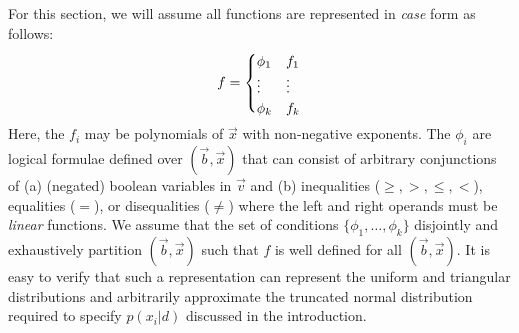 \documentclass[letterpaper]{article}
\renewcommand{\-}{\text{-}}
\begin{document}
{For this section, we will assume all functions
are represented in \emph{case} form as follows:
\vspace{-1mm}
{%
\begin{align}
f = 
\begin{cases}
  \phi_1 & f_1 \\ 
  \vdots & \vdots \\ 
  \phi_k & f_k \\ 
  \vspace{-6mm}
\end{cases} \label{eq:case}
\end{align}
} 
Here, the $f_i$ may be polynomials of $\vec{x}$ with non-negative
exponents.  The $\phi_i$ are logical formulae defined over
$(\vec{b},\vec{x})$ that can consist of arbitrary conjunctions of (a)
(negated) boolean variables in $\vec{v}$ and (b) inequalities
($\geq,>,\leq,<$), equalities ($=$), or disequalities ($\neq$) where
the left and right operands must be \emph{linear} functions.  We
assume that the set of conditions $\{ \phi_1,\ldots,\phi_k \}$ 
disjointly and exhaustively partition $(\vec{b},\vec{x})$ such that $f$
is well defined for all $(\vec{b},\vec{x})$.  It is easy to verify
that such a representation can represent the uniform and triangular
distributions and arbitrarily approximate the truncated normal 
distribution required to specify $p(x_i|d)$ discussed in 
the introduction.


}
\end{document}
